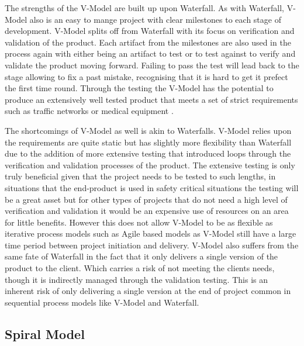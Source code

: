\documentclass{style/CRPITStyle}
\renewcommand{\cite}{\citep}
\begin{document}
\vspace{.1in}

The strengths of the V-Model are built up upon Waterfall.
As with Waterfall, V-Model also is an easy to mange project with clear milestones
to each stage of development.
V-Model splits off from Waterfall with its focus
on verification and validation of the product.
Each artifact from the milestones are also used in the process again with either
being an artifact to test or to test against to verify and validate the product
moving forward. Failing to pass the test will lead back to the stage allowing to
fix a past mistake, recognising that it is hard to get it prefect the first time
round.
Through the testing the V-Model has the potential to produce an extensively well
tested product that meets a set of strict requirements such as traffic networks
or medical equipment \cite{advancements:2010:vmodel}.

\vspace{.1in}

The shortcomings of V-Model as well is akin to Waterfalls.
V-Model relies upon the requirements are quite static but has slightly more
flexibility than Waterfall due to the addition of more extensive testing that introduced loops 
through the verification and validation processes of the product. 
The extensive testing is only truly beneficial given that the project needs to
be tested to such lengths, in situations that the end-product is used in safety
critical situations the testing will be a great asset but for other types of
projects that do not need a high level of verification and validation it would
be an expensive use of resources on an area for little benefits.
However this does not allow V-Model to be as flexible as iterative process models such as
Agile based models as V-Model still have a large time period between project
initiation and delivery. 
V-Model also suffers from the same fate of Waterfall in the fact that it only
delivers a single version of the product to the client. Which carries a risk of 
not meeting the clients needs, though it is indirectly managed through the validation testing.
This is an inherent risk of only delivering a single version at the end
of project common in sequential process models like V-Model and Waterfall.


\subsection{Spiral Model} %
\end{document}

